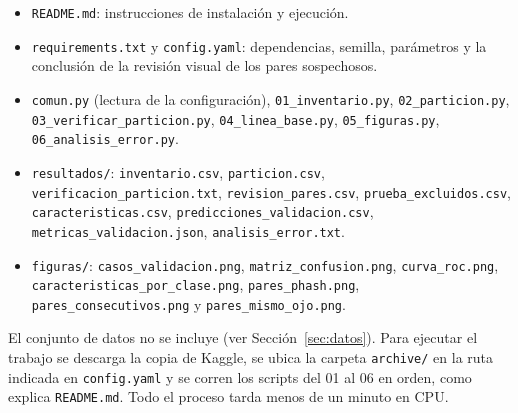 \documentclass[pdflatex,sn-mathphys-num]{sn-jnl}%
\theoremstyle{thmstyleone}%
\theoremstyle{thmstyletwo}%
\theoremstyle{thmstylethree}%
\begin{document}
\begin{appendices}
{\raggedright
\begin{itemize}
\item \texttt{README.md}: instrucciones de instalación y ejecución.
\item \texttt{requirements.txt} y \texttt{config.yaml}: dependencias, semilla, parámetros y la conclusión de la revisión visual de los pares sospechosos.
\item \texttt{comun.py} (lectura de la configuración), \texttt{01\_inventario.py}, \texttt{02\_particion.py}, \texttt{03\_verificar\_particion.py}, \texttt{04\_linea\_base.py}, \texttt{05\_figuras.py}, \texttt{06\_analisis\_error.py}.
\item \texttt{resultados/}: \texttt{inventario.csv}, \texttt{particion.csv}, \texttt{verificacion\_particion.txt}, \texttt{revision\_pares.csv}, \texttt{prueba\_excluidos.csv}, \texttt{caracteristicas.csv}, \texttt{predicciones\_validacion.csv}, \texttt{metricas\_validacion.json}, \texttt{analisis\_error.txt}.
\item \texttt{figuras/}: \texttt{casos\_validacion.png}, \texttt{matriz\_confusion.png}, \texttt{curva\_roc.png}, \texttt{caracteristicas\_por\_clase.png}, \texttt{pares\_phash.png}, \texttt{pares\_consecutivos.png} y \texttt{pares\_mismo\_ojo.png}.
\end{itemize}
}

El conjunto de datos no se incluye (ver Sección~\ref{sec:datos}). Para ejecutar el trabajo se descarga la copia de Kaggle, se ubica la carpeta \texttt{archive/} en la ruta indicada en \texttt{config.yaml} y se corren los scripts del 01 al 06 en orden, como explica \texttt{README.md}. Todo el proceso tarda menos de un minuto en CPU.

\end{appendices}
\end{document}
